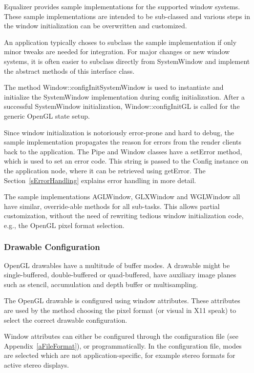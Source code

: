 \documentclass[10pt,a4]{scrartcl}
\newcommand{\sref}[1]{Section~\ref{#1}}
\newcommand{\aref}[1]{Appendix~\ref{#1}}
\begin{document}
Equalizer provides sample implementations for the supported window
systems. These sample implementations are intended to be sub-classed and
various steps in the window initialization can be overwritten and
customized.

An application typically choses to subclass the sample implementation if
only minor tweaks are needed for integration. For major changes or new
window systems, it is often easier to subclass directly from
\textsf{SystemWindow} and implement the abstract methods of this interface
class.

The method \textsf{Window::configInitSystemWindow} is used to instantiate
and initialize the \textsf{SystemWindow} implementation during config
initialization. After a successful \textsf{SystemWindow} initialization,
\textsf{Window::configInitGL} is called for the generic OpenGL state
setup.

Since window initialization is notoriously error-prone and hard to debug, the
sample implementation propagates the reason for errors from the render clients
back to the application. The \textsf{Pipe} and \textsf{Window} classes have a
\textsf{setError} method, which is used to set an error code. This string is
passed to the \textsf{Config} instance on the application node, where it can be
retrieved using \textsf{getError}. The \sref{sErrorHandling} explains error
handling in more detail.

The sample implementations \textsf{AGLWindow}, \textsf{GLXWindow} and
\textsf{WGLWindow} all have similar, override-able methods for all
sub-tasks. This allows partial customization, without the need of
rewriting tedious window initialization code, e.g., the OpenGL pixel
format selection.

\subsubsection{\label{sDrawableConfig}Drawable Configuration}

OpenGL drawables have a multitude of buffer modes. A drawable might be
single-buffered, double-buffered or quad-buffered, have auxiliary image
planes such as stencil, accumulation and depth buffer or multisampling.

The OpenGL drawable is configured using window attributes. These
attributes are used by the method choosing the pixel format (or visual
in X11 speak) to select the correct drawable configuration.

Window attributes can either be configured through the configuration
file (see \aref{aFileFormat}), or programmatically. In the configuration
file, modes are selected which are not application-specific, for example
stereo formats for active stereo displays. 
\end{document}
